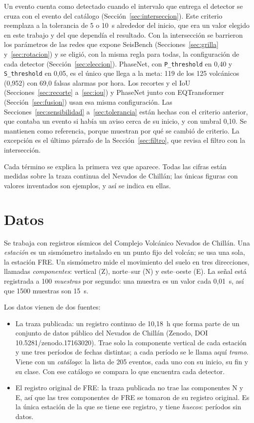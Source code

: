 \documentclass[11pt,a4paper,oneside,spanish,oldfontcommands]{memoir}
\begin{document}
Un evento cuenta como detectado cuando el intervalo que entrega el detector se
cruza con el evento del catálogo (Sección~\ref{sec:interseccion}). Este
criterio reemplaza a la tolerancia de 5 o 10~s alrededor del inicio, que era un
valor elegido en este trabajo y del que dependía el resultado. Con la intersección
se barrieron los parámetros de las redes que expone SeisBench
(Secciones~\ref{sec:grilla} y~\ref{sec:rotacion}) y se eligió, con la misma
regla para todas, la configuración de cada detector
(Sección~\ref{sec:eleccion}). PhaseNet, con \texttt{P\_threshold} en 0,40 y
\texttt{S\_threshold} en 0,05, es el único que llega a la meta: 119 de los 125
volcánicos (0,952) con 69,0 falsas alarmas por hora. Los recortes y el IoU
(Secciones~\ref{sec:recorte} a~\ref{sec:iou}) y PhaseNet junto con
EQTransformer (Sección~\ref{sec:fusion}) usan esa misma configuración. Las
Secciones~\ref{sec:sensibilidad} a~\ref{sec:tolerancia} están hechas con el
criterio anterior, que contaba un evento si había un aviso cerca de su inicio, y
con umbral 0,10. Se mantienen como referencia, porque muestran por qué se
cambió de criterio. La excepción es el último párrafo
de la Sección~\ref{sec:filtro}, que revisa el filtro con la intersección.

Cada término se explica la primera vez que aparece. Todas las cifras están
medidas sobre la traza continua del Nevados de Chillán; las únicas figuras con
valores inventados son ejemplos, y así se indica en ellas.

\section{Datos}

Se trabaja con registros sísmicos del Complejo Volcánico Nevados de Chillán.
Una \emph{estación} es un sismómetro instalado en un punto fijo del volcán; se
usa una sola, la estación FRE. Un sismómetro mide el movimiento del suelo en tres
direcciones, llamadas \emph{componentes}: vertical (Z), norte--sur (N) y
este--oeste (E). La señal está registrada a 100 \emph{muestras} por segundo:
una muestra es un valor cada 0,01~s, así que 1500 muestras son 15~s.

Los datos vienen de dos fuentes:

\begin{itemize}
\item La traza publicada: un registro continuo de 10,18~h que forma
  parte de un conjunto de datos público del Nevados de Chillán (Zenodo, DOI
  10.5281/zenodo.17163020). Trae solo la componente vertical de cada estación y
  une tres períodos de fechas distintas; a cada período se le llama aquí \emph{tramo}.
  Viene con un \emph{catálogo}: la lista de 205 eventos, cada uno con su inicio,
  su fin y su clase. Con ese catálogo se compara lo que encuentra cada detector.
\item El registro original de FRE: la traza publicada no trae las
  componentes N y E, así que las tres componentes de FRE se tomaron de su  registro original. Es la única estación de la que se tiene ese registro, y
  tiene \emph{huecos}: períodos sin datos.
\end{itemize}
\end{document}
